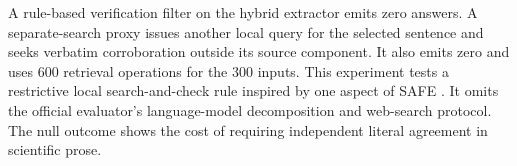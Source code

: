 A rule-based verification filter on the hybrid extractor emits zero answers. A separate-search proxy issues another local query for the selected sentence and seeks verbatim corroboration outside its source component. It also emits zero and uses 600 retrieval operations for the 300 inputs. This experiment tests a restrictive local search-and-check rule inspired by one aspect of SAFE \cite{SAFE}. It omits the official evaluator's language-model decomposition and web-search protocol. The null outcome shows the cost of requiring independent literal agreement in scientific prose.
